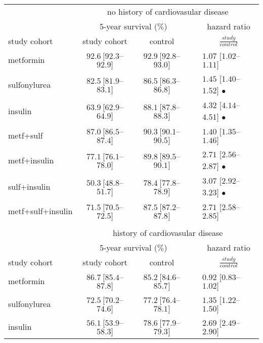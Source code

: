\begin{table}[!p]
\begin{tabular}{lcccl}
\toprule
			 & \multicolumn{4}{c}{no history of cardiovasular disease}		 \\\cline{2-5} 
			 & \multicolumn{2}{c}{5-year survival ($\%$)} 		& & \multicolumn{1}{c}{hazard ratio} \\\cline{2-3} \cline{5-5}
study cohort	& study cohort 				& control 	&	& \multicolumn{1}{c}{$\frac{study}{control}$} \\
\midrule

metformin 		        & $92.6\ [92.3$--$92.9]$ & $92.9\ [92.8$--$93.0]$ & & $1.07$ $[1.02$--$1.11]$ \\
sulfonylurea 			& $82.5\ [81.9$--$83.1]$ & $86.5\ [86.3$--$86.8]$ & & $1.45$ $[1.40$--$1.52]$ $\bullet$ \\
insulin				& $63.9\ [62.9$--$64.9]$ & $88.1\ [87.8$--$88.3]$ & & $4.32$ $[4.14$--$4.51]$ $\bullet$ \\

metf+sulf				& $87.0\ [86.5$--$87.4]$ & $90.3\ [90.1$--$90.5]$ & & $1.40$ $[1.35$--$1.46]$ \\
metf+insulin			& $77.1\ [76.1$--$78.0]$ & $89.8\ [89.5$--$90.1]$ & & $2.71$ $[2.56$--$2.87]$ $\bullet$ \\
sulf+insulin			& $50.3\ [48.8$--$51.7]$ & $78.4\ [77.8$--$78.9]$ & & $3.07$ $[2.92$--$3.23]$ $\bullet$ \\
metf+sulf+insulin		& $71.5\ [70.5$--$72.5]$ & $87.5\ [87.2$--$87.8]$ & & $2.71$ $[2.58$--$2.85]$ \\
& \\
			 & \multicolumn{4}{c}{history of cardiovasular disease}		 \\\cline{2-5} 
			 & \multicolumn{2}{c}{5-year survival ($\%$)} 		& & \multicolumn{1}{c}{hazard ratio} \\\cline{2-3} \cline{5-5}
study cohort	         & study cohort 				& control 	&	& \multicolumn{1}{c}{$\frac{study}{control}$} \\
\midrule
metformin 				 & $86.7\ [85.4$--$87.8]$ & $85.2\ [84.6$--$85.7]$ & & $0.92$ $[0.83$--$1.02]$ \\ %
sulfonylurea 			        & $72.5\ [70.2$--$74.6]$ & $77.2\ [76.4$--$78.1]$ & & $1.35$ $[1.22$--$1.50]$ \\ %
insulin					& $56.1\ [53.9$--$58.3]$ & $78.6\ [77.9$--$79.3]$ & & $2.69$ $[2.49$--$2.90]$ \\ %


\end{tabular}
\end{table}
